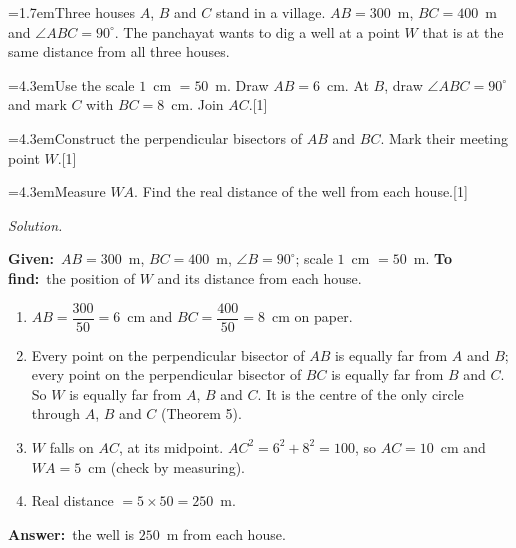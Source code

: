 \documentclass[11pt,a4paper]{article}
\newcounter{qn}
\newcommand{\ques}{\par\medskip\refstepcounter{qn}\noindent\hangindent=1.7em\hangafter=1\makebox[1.7em][l]{\textbf{\arabic{qn}.}}\ignorespaces}
\newcommand{\pc}[2]{\par\smallskip\noindent\hspace*{2em}\hangindent=4.3em\hangafter=1\makebox[2em][l]{(#1)}\hspace{0.3em}#2\par}
\newenvironment{answerblock}
  {\par\needspace{6\baselineskip}\smallskip\begingroup\small\linespread{1.2}\selectfont\color{muted}\noindent\textit{Solution.}\par}
  {\par\endgroup\medskip}
\newcommand{\mks}[1]{\hfill\mbox{[#1]}}
\newcommand{\Given}{\textbf{Given:}~}
\newcommand{\Tofind}{\textbf{To find:}~}
\newcommand{\Ans}{\textbf{Answer:}~}
\begin{document}
\ques Three houses $A$, $B$ and $C$ stand in a village. $AB=300$~m, $BC=400$~m and $\angle ABC=90^\circ$. The panchayat wants to dig a well at a point $W$ that is at the same distance from all three houses.
\pc{a}{Use the scale $1$~cm $=50$~m. Draw $AB=6$~cm. At $B$, draw $\angle ABC=90^\circ$ and mark $C$ with $BC=8$~cm. Join $AC$.\mks{1}}
\pc{b}{Construct the perpendicular bisectors of $AB$ and $BC$. Mark their meeting point $W$.\mks{1}}
\pc{c}{Measure $WA$. Find the real distance of the well from each house.\mks{1}}

\begin{answerblock}
\begin{minipage}[t]{0.66\linewidth}\vspace{0pt}
\Given $AB=300$~m, $BC=400$~m, $\angle B=90^\circ$; scale $1$~cm $=50$~m. \Tofind the position of $W$ and its distance from each house.
\begin{enumerate}[label=\arabic*.,leftmargin=1.6em,itemsep=0pt,topsep=2pt]
\item $AB=\dfrac{300}{50}=6$~cm and $BC=\dfrac{400}{50}=8$~cm on paper.
\item Every point on the perpendicular bisector of $AB$ is equally far from $A$ and $B$; every point on the perpendicular bisector of $BC$ is equally far from $B$ and $C$. So $W$ is equally far from $A$, $B$ and $C$. It is the centre of the only circle through $A$, $B$ and $C$ (Theorem 5).
\item $W$ falls on $AC$, at its midpoint. $AC^2=6^2+8^2=100$, so $AC=10$~cm and $WA=5$~cm (check by measuring).
\item Real distance $=5\times50=250$~m.
\end{enumerate}
\Ans the well is $250$~m from each house.
\end{minipage}\hfill
\begin{minipage}[t]{0.3\linewidth}\vspace{0pt}
\centering
{}
\end{minipage}
\end{answerblock}
\end{document}
